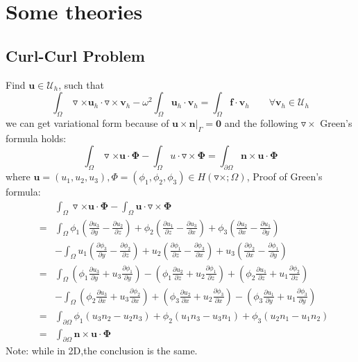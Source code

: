 \documentclass[a4paper,11pt]{article}
\begin{document}
\section{Some theories}
\subsection{Curl-Curl Problem}
Find $\mathbf{u}\in\mathcal{U}_h$, such that
\begin{equation}\label{variform:cc}
\int_{\Omega}\triangledown\times\mathbf{u}_h\cdot\triangledown\times\mathbf{v}_h - \omega^2\int_{\Omega}\mathbf{u}_h\cdot\mathbf{v}_h = \int_{\Omega}\mathbf{f}\cdot\mathbf{v}_h   \qquad \forall \mathbf{v}_h\in\mathcal{U}_h
\end{equation}\label{formula:green_curl}
we can get variational form because of $\mathbf{u}\times\mathbf{n}|_\Gamma = \mathbf{0}$ and the following $\triangledown\times$ Green's formula holds:
\begin{equation}
\int_{\Omega}\triangledown\times\mathbf{u}\cdot\mathbf{\Phi} - \int_{\Omega} u\cdot\triangledown\times\mathbf{\Phi} = \int_{\partial\Omega} \mathbf{n}\times\mathbf{u}\cdot\mathbf{\Phi}
\end{equation}
where $\mathbf{u} = (u_1,u_2,u_3),\Phi = (\phi_1,\phi_2,\phi_3)\in H(\triangledown\times;\Omega)$,\newline
Proof of Green's formula:
\begin{eqnarray}
\nonumber
& &\int_{\Omega}\triangledown\times\mathbf{u}\cdot\mathbf{\Phi} - \int_{\Omega} \mathbf{u}\cdot\triangledown\times\mathbf{\Phi} \\ \nonumber
&=&\int_{\Omega}\phi_1(\frac{\partial u_3}{\partial y} - \frac{\partial u_2}{\partial z}) +
                \phi_2(\frac{\partial u_1}{\partial z} - \frac{\partial u_3}{\partial x}) +
                \phi_3(\frac{\partial u_2}{\partial x} - \frac{\partial u_1}{\partial y})  \\ \nonumber
& &-\int_{\Omega}u_1(\frac{\partial \phi_3}{\partial y} - \frac{\partial \phi_2}{\partial z}) +
                 u_2(\frac{\partial \phi_1}{\partial z} - \frac{\partial \phi_3}{\partial x}) +
                 u_3(\frac{\partial \phi_2}{\partial x} - \frac{\partial \phi_1}{\partial y})  \\ \nonumber
&=&\int_{\Omega}(\phi_1\frac{\partial u_3}{\partial y} + u_3\frac{\partial \phi_1}{\partial y}) -
                (\phi_1\frac{\partial u_2}{\partial z} + u_2\frac{\partial \phi_1}{\partial z}) +
                (\phi_2\frac{\partial u_1}{\partial z} + u_1\frac{\partial \phi_2}{\partial z}) \\ \nonumber
& &-\int_{\Omega}(\phi_2\frac{\partial u_3}{\partial x} + u_3\frac{\partial \phi_2}{\partial x}) +
                 (\phi_3\frac{\partial u_2}{\partial x} + u_2\frac{\partial \phi_3}{\partial x}) -
                 (\phi_3\frac{\partial u_1}{\partial y} + u_1\frac{\partial \phi_3}{\partial y}) \\ \nonumber
&=&\int_{\partial\Omega} \phi_1(u_3n_2 - u_2n_3) + \phi_2(u_1n_3-u_3n_1) + \phi_3(u_2n_1 - u_1n_2) \\ \nonumber
&=&\int_{\partial\Omega} \mathbf{n}\times\mathbf{u}\cdot\mathbf{\Phi}
\end{eqnarray}
Note: while in 2D,the conclusion is the same.
\end{document}
